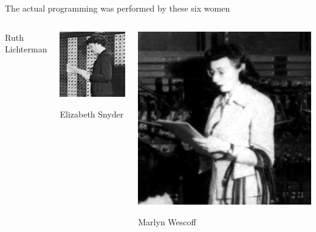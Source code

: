 \documentclass[aspectratio=169]{beamer}
\begin{document}
\begin{frame}{The actual programming was performed by these six women}
\begin{columns}[t]
\begin{center}
Ruth Lichterman
\end{center}

\begin{center}
\includegraphics[width=\linewidth]{Betty-Snyder.jpg}

Elizabeth Snyder
\end{center}

\begin{center}
\includegraphics[width=\linewidth]{Marlyn-Meltzer.jpg}

Marlyn Wescoff
\end{center}
\end{columns}
\end{frame}
\end{document}
